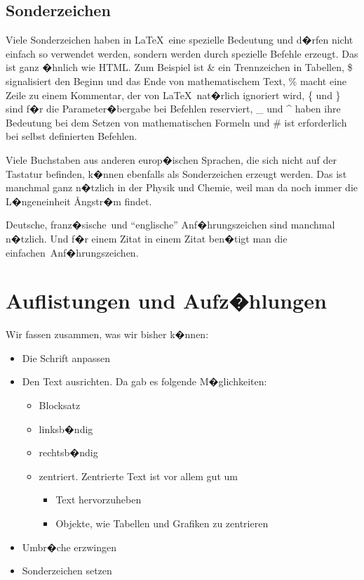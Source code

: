 \documentclass[11pt,a4paper]{article} %
\begin{document}
\subsection{Sonderzeichen}
\label{Sonderzeichen}

Viele Sonderzeichen haben in \LaTeX\ eine spezielle Bedeutung und d�rfen nicht einfach so verwendet werden, sondern werden durch spezielle Befehle erzeugt. Das ist ganz �hnlich wie HTML. Zum Beispiel ist \& ein Trennzeichen in Tabellen, \$ signalisiert den Beginn und das Ende von mathematischem Text, \% macht eine Zeile zu einem Kommentar, der von \LaTeX\ nat�rlich ignoriert wird, \{ und \} sind f�r die Parameter�bergabe bei Befehlen reserviert, \_ und \^{} haben ihre Bedeutung bei dem Setzen von mathematischen Formeln und \# ist erforderlich bei selbst definierten Befehlen.

Viele Buchstaben aus anderen europ�ischen Sprachen, die sich nicht auf der Tastatur befinden, k�nnen ebenfalls als Sonderzeichen erzeugt werden. Das ist manchmal ganz n�tzlich in der Physik und Chemie, weil man da noch immer die L�ngeneinheit \AA ngstr�m findet. 

\glqq Deutsche\grqq, \flqq franz�sische\frqq\ und ``englische'' Anf�hrungszeichen sind manchmal n�tzlich. Und f�r einem Zitat in einem Zitat ben�tigt man die \glq einfachen\grq\ Anf�hrungszeichen. 


\section{Auflistungen und Aufz�hlungen}
\label{Listen}


Wir fassen zusammen, was wir bisher k�nnen:

\begin{itemize}
 \item Die Schrift anpassen
 \item Den Text ausrichten. Da gab es folgende M�glichkeiten:
    \begin{itemize}
        \item Blocksatz
        \item linksb�ndig
        \item rechtsb�ndig
        \item zentriert. Zentrierte Text ist vor allem gut um
            \begin{itemize}
                \item Text hervorzuheben
                \item Objekte, wie Tabellen und Grafiken zu zentrieren
            \end{itemize}
    \end{itemize}
 \item Umbr�che erzwingen
 \item Sonderzeichen setzen
\end{itemize}
\end{document}
